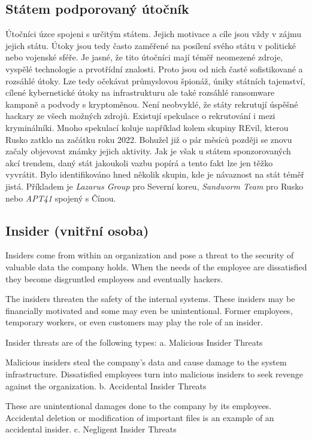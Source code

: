 \subsection{Státem podporovaný útočník}
Útočníci úzce spojeni s určitým státem.
Jejich motivace a cíle jsou vždy v zájmu jejich státu.
Útoky jsou tedy často zaměřené na posílení svého státu v politické nebo vojenské sféře.
Je jasné, že tito útočníci mají téměř neomezené zdroje, vyspělé technologie a prvotřídní znalosti.
Proto jsou od nich časté sofistikované a rozsáhlé útoky.
Lze tedy očekávat průmyslovou špionáž, úniky státních tajemství, cílené kybernetické útoky na infrastrukturu ale také rozsáhlé ransomware kampaně a podvody s kryptoměnou.
Není neobvyklé, že státy rekrutují úspěšné hackary ze všech možných zdrojů.
Existují spekulace o rekrutování i mezi kryminálníki.
Mnoho spekulací koluje například kolem skupiny REvil, kterou Rusko zatklo na začátku roku 2022\cite{REvil_story}.
Bohužel již o pár měsíců později se znovu začaly objevovat známky jejich aktivity.
Jak je však u státem sponzorovaných akcí trendem, daný stát jakoukoli vazbu popírá a tento fakt lze jen těžko vyvrátit.
Bylo identifikováno hned několik skupin, kde je návaznost na stát téměř jistá.
Příkladem je \textit{Lazarus Group} pro Severní koreu, \textit{Sandworm Team} pro Rusko nebo \textit{APT41} spojený s Čínou\cite{Mitre_groups}.






\subsection{Insider (vnitřní osoba)}
Insiders come from within an organization and pose a threat to the security of valuable data the company holds. When the needs of the employee are dissatisfied they become disgruntled employees and eventually hackers.

The insiders threaten the safety of the internal systems. These insiders may be financially motivated and some may even be unintentional. Former employees, temporary workers, or even customers may play the role of an insider.

Insider threats are of the following types:
a. Malicious Insider Threats

Malicious insiders steal the company’s data and cause damage to the system infrastructure. Dissatisfied employees turn into malicious insiders to seek revenge against the organization.
b. Accidental Insider Threats

These are unintentional damages done to the company by its employees. Accidental deletion or modification of important files is an example of an accidental insider.
c. Negligent Insider Threats

